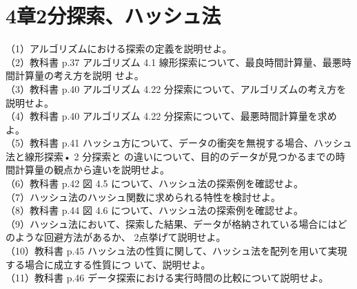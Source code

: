 \documentclass[dvipdfmx]{jreport}
\begin{document}
\section*{4章2分探索、ハッシュ法}
（1）アルゴリズムにおける探索の定義を説明せよ。\\
（2）教科書 p.37 アルゴリズム 4.1 線形探索について、最良時間計算量、最悪時間計算量の考え方を説明 せよ。\\
（3）教科書 p.40 アルゴリズム 4.22 分探索について、アルゴリズムの考え方を説明せよ。\\
（4）教科書 p.40 アルゴリズム 4.22 分探索について、最悪時間計算量を求めよ。\\
（5）教科書 p.41 ハッシュ方について、データの衝突を無視する場合、ハッシュ法と線形探索• 2 分探索と の違いについて、目的のデータが見つかるまでの時間計算量の観点から違いを説明せよ。\\
（6）教科書 p.42 図 4.5 について、ハッシュ法の探索例を確認せよ。\\
（7）ハッシュ法のハッシュ関数に求められる特性を検討せよ。\\
（8）教科書 p.44 図 4.6 について、ハッシュ法の探索例を確認せよ。\\
（9）ハッシュ法において、探索した結果、データが格納されている場合にはどのような回避方法があるか、 2点挙げて説明せよ。\\
（10）教科書 p.45 ハッシュ法の性質に関して、ハッシュ法を配列を用いて実現する場合に成立する性質につ いて、説明せよ。\\
（11）教科書 p.46 データ探索における実行時間の比較について説明せよ。
\end{document}
